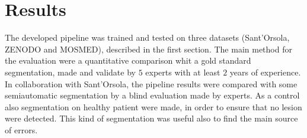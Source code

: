 \documentclass{standalone}
\begin{document}
	\chapter{Results}
	

	The developed pipeline was trained and tested on three datasets (Sant'Orsola, ZENODO and MOSMED), described in the first section. 
	The main method for the evaluation were a quantitative comparison whit a gold standard segmentation, made and validate by $5$ experts with at least $2$ years of experience. In collaboration with Sant'Orsola, the pipeline results were compared with some semiautomatic segmentation by a blind evaluation made by experts.
	As a control also segmentation on healthy patient were made, in order to ensure that no lesion were detected. This kind of segmentation was useful also to find the main source of errors. 
\end{document}

